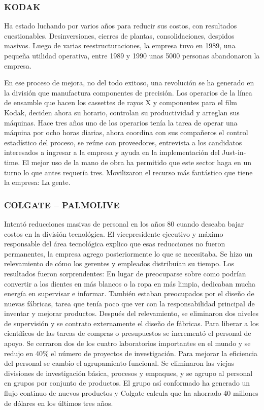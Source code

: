 \begin{recuadro}
\subsubsection*{KODAK}
Ha estado luchando por varios años para reducir sus costos, con resultados cuestionables. Desinversiones, cierres de plantas, consolidaciones, despidos masivos. Luego de varias reestructuraciones, la empresa tuvo en 1989, una pequeña utilidad operativa, entre 1989 y 1990 unas 5000 personas abandonaron la empresa.

En ese proceso de mejora, no del todo exitoso, una revolución se ha generado en la división que manufactura componentes de precisión. Los operarios de la línea de ensamble que hacen los cassettes de rayos X y componentes para el film Kodak, deciden ahora su horario, controlan su productividad y arreglan sus máquinas. Hace tres años uno de los operarios tenía la tarea de operar una máquina por ocho horas diarias, ahora coordina con sus compañeros el control estadístico del proceso, se reúne con proveedores, entrevista a los candidatos interesados a ingresar a la empresa y ayuda en la implementación del Just-in-time. El mejor uso de la mano de obra ha permitido que este sector haga en un turno lo que antes requería tres. Movilizaron el recurso más fantástico que tiene la empresa: La gente.
\end{recuadro}

\begin{recuadro}
\subsubsection*{COLGATE – PALMOLIVE}
Intentó reducciones masivas de personal en los años 80 cuando deseaba bajar costos en la división tecnológica. El vicepresidente ejecutivo y máximo responsable del área tecnológica explico que esas reducciones no fueron permanentes, la empresa agrego posteriormente lo que se necesitaba. Se hizo un relevamiento de cómo los gerentes y empleados distribuían su tiempo. Los resultados fueron sorprendentes: En lugar de preocuparse sobre como podrían convertir a los dientes en más blancos o la ropa en más limpia, dedicaban mucha energía en supervisar e informar. También estaban preocupados por el diseño de nuevas fábricas, tarea que tenía poco que ver con la responsabilidad principal de inventar y mejorar productos. Después del relevamiento, se eliminaron dos niveles de supervisión y se contrato externamente el diseño de fábricas. Para liberar a los científicos de las tareas de compras o presupuestos se incrementó el personal de apoyo. Se cerraron dos de los cuatro laboratorios importantes en el mundo y se redujo en 40\% el número de proyectos de investigación. Para mejorar la eficiencia del personal se cambio el agrupamiento funcional. Se eliminaron las viejas divisiones de investigación básica, procesos y empaques, y se agrupo al personal en grupos por conjunto de productos. El grupo así conformado ha generado un flujo continuo de nuevos productos y Colgate calcula que ha ahorrado 40 millones de dólares en los últimos tres años.
\end{recuadro}

